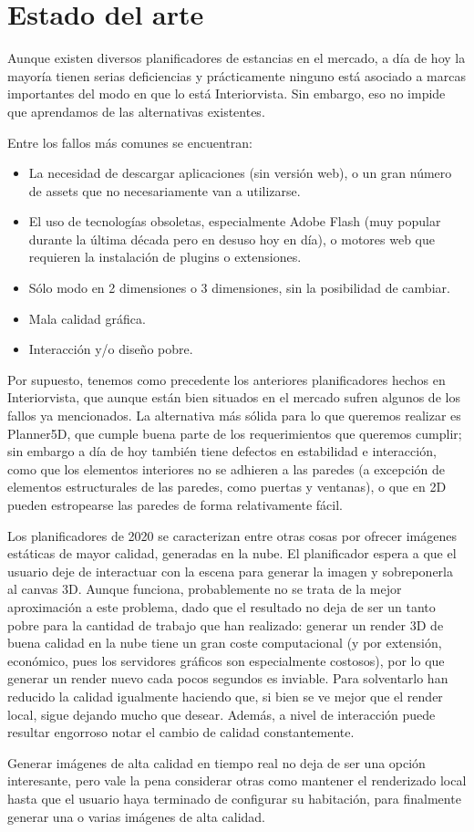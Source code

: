 \section{Estado del arte}
Aunque existen diversos planificadores de estancias en el mercado, a día de hoy la mayoría tienen serias deficiencias y prácticamente ninguno está asociado a marcas importantes del modo en que lo está Interiorvista. Sin embargo, eso no impide que aprendamos de las alternativas existentes.

Entre los fallos más comunes se encuentran:
\begin{itemize}
    \item La necesidad de descargar aplicaciones (sin versión web), o un gran número de assets que no necesariamente van a utilizarse.
    \item El uso de tecnologías obsoletas, especialmente Adobe Flash (muy popular durante la última década pero en desuso hoy en día), o motores web que requieren la instalación de plugins o extensiones.
    \item Sólo modo en 2 dimensiones o 3 dimensiones, sin la posibilidad de cambiar.
    \item Mala calidad gráfica.
    \item Interacción y/o diseño pobre.
\end{itemize}

Por supuesto, tenemos como precedente los anteriores planificadores hechos en Interiorvista, que aunque están bien situados en el mercado sufren algunos de los fallos ya mencionados. La alternativa más sólida para lo que queremos realizar es Planner5D\cite{planner5d}, que cumple buena parte de los requerimientos que queremos cumplir; sin embargo a día de hoy también tiene defectos en estabilidad e interacción, como que los elementos interiores no se adhieren a las paredes (a excepción de elementos estructurales de las paredes, como puertas y ventanas), o que en 2D pueden estropearse las paredes de forma relativamente fácil.

Los planificadores de 2020\cite{2020} se caracterizan entre otras cosas por ofrecer imágenes estáticas de mayor calidad, generadas en la nube. El planificador espera a que el usuario deje de interactuar con la escena para generar la imagen y sobreponerla al canvas 3D. Aunque funciona, probablemente no se trata de la mejor aproximación a este problema, dado que el resultado no deja de ser un tanto pobre para la cantidad de trabajo que han realizado: generar un render 3D de buena calidad en la nube tiene un gran coste computacional (y por extensión, económico, pues los servidores gráficos son especialmente costosos), por lo que generar un render nuevo cada pocos segundos es inviable. Para solventarlo han reducido la calidad igualmente haciendo que, si bien se ve mejor que el render local, sigue dejando mucho que desear. Además, a nivel de interacción puede resultar engorroso notar el cambio de calidad constantemente.

Generar imágenes de alta calidad en tiempo real no deja de ser una opción interesante, pero vale la pena considerar otras como mantener el renderizado local hasta que el usuario haya terminado de configurar su habitación, para finalmente generar una o varias imágenes de alta calidad.